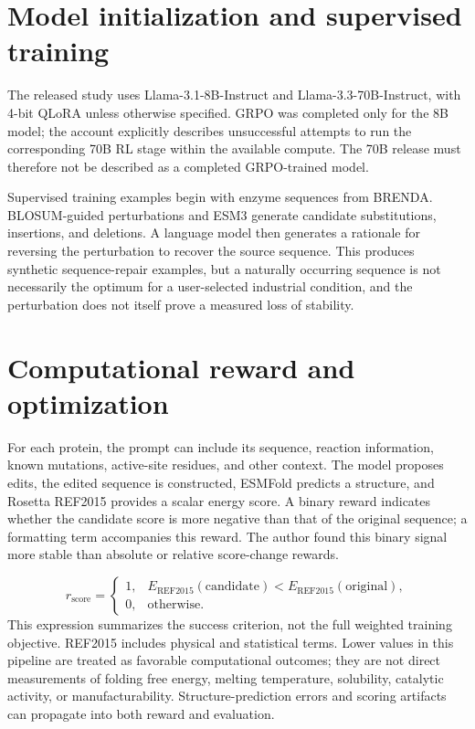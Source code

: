 \documentclass[10pt,a4paper]{article}
\begin{document}
\section{Model initialization and supervised training}
The released study uses Llama-3.1-8B-Instruct and Llama-3.3-70B-Instruct, with 4-bit QLoRA unless otherwise specified. GRPO was completed only for the 8B model; the account explicitly describes unsuccessful attempts to run the corresponding 70B RL stage within the available compute. The 70B release must therefore not be described as a completed GRPO-trained model. \cite{ref1}

Supervised training examples begin with enzyme sequences from BRENDA. BLOSUM-guided perturbations and ESM3 generate candidate substitutions, insertions, and deletions. A language model then generates a rationale for reversing the perturbation to recover the source sequence. This produces synthetic sequence-repair examples, but a naturally occurring sequence is not necessarily the optimum for a user-selected industrial condition, and the perturbation does not itself prove a measured loss of stability. \cite{ref1}

\section{Computational reward and optimization}
For each protein, the prompt can include its sequence, reaction information, known mutations, active-site residues, and other context. The model proposes edits, the edited sequence is constructed, ESMFold predicts a structure, and Rosetta REF2015 provides a scalar energy score. A binary reward indicates whether the candidate score is more negative than that of the original sequence; a formatting term accompanies this reward. The author found this binary signal more stable than absolute or relative score-change rewards. \cite{ref1,ref2}

\[r_{\mathrm{score}}=\begin{cases}1,& E_{\mathrm{REF2015}}(\mathrm{candidate})<E_{\mathrm{REF2015}}(\mathrm{original}),\\0,&\text{otherwise}.\end{cases}\]
This expression summarizes the success criterion, not the full weighted training objective. REF2015 includes physical and statistical terms. Lower values in this pipeline are treated as favorable computational outcomes; they are not direct measurements of folding free energy, melting temperature, solubility, catalytic activity, or manufacturability. Structure-prediction errors and scoring artifacts can propagate into both reward and evaluation.
\end{document}
